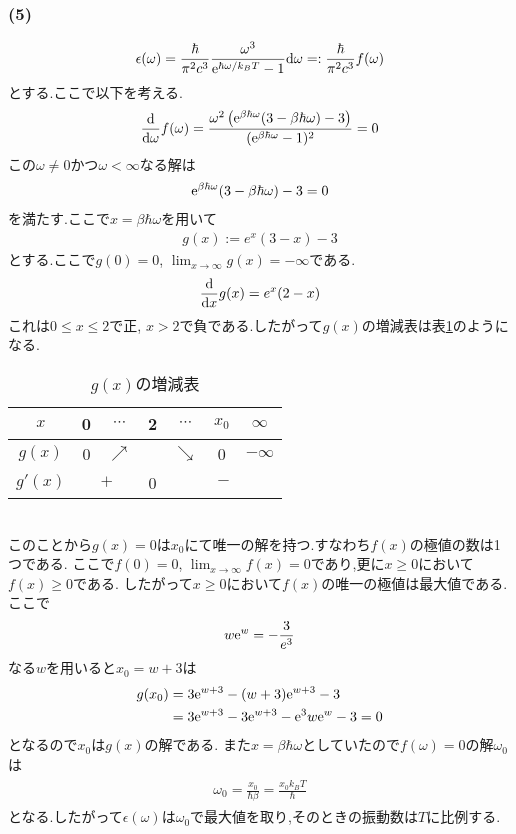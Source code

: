 \documentclass[uplatex,a4j,11pt,dvipdfmx]{jsarticle}
\begin{document}
\subsubsection*{(5)}
\begin{align}
  \epsilon(\omega)=\frac{\hbar}{\pi^2c^3}\frac{\omega^3}{{\rm e}^{\hbar\omega/k_BT}-1}{\rm d}\omega=:\frac{\hbar}{\pi^2c^3}f(\omega)
\end{align}
とする.ここで以下を考える.
\begin{align}
  \frac{\rm d}{{\rm d}\omega}f(\omega)=\frac{\omega^2\left({\rm e}^{\beta\hbar\omega}(3-\beta\hbar\omega)-3\right)}{({\rm e}^{\beta\hbar\omega}-1)^2}=0
\end{align}
この$\omega\neq0$かつ$\omega<\infty$なる解は
\begin{align}
  {\rm e}^{\beta\hbar\omega}(3-\beta\hbar\omega)-3=0
\end{align}
を満たす.ここで$x=\beta\hbar\omega$を用いて
\begin{align}
  g(x):=e^x(3-x)-3
\end{align}
とする.ここで$g(0)=0$, $\lim_{x\rightarrow\infty}g(x)=-\infty$である.
\begin{align}
  \frac{\rm d}{{\rm d}x}g(x)=e^x(2-x)
\end{align}
これは$0\leq x\leq 2$で正, $x>2$で負である.したがって$g(x)$の増減表は表\ref{tab:zougen}のようになる.
\begin{table}[h]
\caption{$g(x)$の増減表}
\label{tab:zougen}
\centering
\begin{tabular}{c|cccccc}
\hline
$x$&0&$\cdots$&2&$\cdots$&$x_0$&$\infty$\\
\hline \hline
$g(x)$&0&$\nearrow$&&$\searrow$&0&$-\infty$\\
$g'(x)$&\multicolumn{2}{c}{$+$}&0&\multicolumn{3}{c}{$-$}\\
\hline
\end{tabular}
\end{table}\\
このことから$g(x)=0$は$x_0$にて唯一の解を持つ.すなわち$f(x)$の極値の数は1つである.
ここで$f(0)=0$, $\lim_{x\rightarrow\infty}f(x)=0$であり,更に$x\geq0$において$f(x)\geq0$である.
したがって$x\geq0$において$f(x)$の唯一の極値は最大値である.
ここで
\begin{align}
  w{\rm e}^w=-\frac{3}{e^3}
\end{align}
なる$w$を用いると$x_0=w+3$は
\begin{align}
  \begin{split}
    g(x_0)&=3{\rm e}^{w+3}-(w+3){\rm e}^{w+3}-3\\
    &=3{\rm e}^{w+3}-3{\rm e}^{w+3}-{\rm e}^3w{\rm e}^w-3=0
  \end{split}
\end{align}
となるので$x_0$は$g(x)$の解である.
また$x=\beta\hbar\omega$としていたので$f(\omega)=0$の解$\omega_0$は
\begin{align}
  \begin{split}
    \omega_0=\frac{x_0}{\hbar\beta}=\frac{x_0k_BT}{\hbar}
  \end{split}
\end{align}
となる.したがって$\epsilon(\omega)$は$\omega_0$で最大値を取り,そのときの振動数は$T$に比例する.
\end{document}
